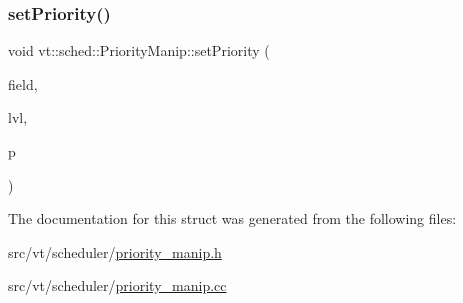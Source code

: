 \mbox{\label{structvt_1_1sched_1_1_priority_manip_a1e3fd14daa6da7902a621d7e175b0d76}} 
\subsubsection{\texorpdfstring{set\+Priority()}{setPriority()}}
{\footnotesize\ttfamily void vt\+::sched\+::\+Priority\+Manip\+::set\+Priority (\begin{DoxyParamCaption}\item[{\hyperlink{namespacevt_a86bff9f556eb761b27fc8600d006ac04}{Priority\+Type} \&}]{field,  }\item[{\hyperlink{namespacevt_a53e07fdb3351b0f263e0dfd51b968d5e}{Priority\+Level\+Type}}]{lvl,  }\item[{\hyperlink{namespacevt_a86bff9f556eb761b27fc8600d006ac04}{Priority\+Type}}]{p }\end{DoxyParamCaption})\hspace{0.3cm}{\ttfamily [static]}}



The documentation for this struct was generated from the following files\+:\begin{DoxyCompactItemize}
\item 
src/vt/scheduler/\hyperlink{priority__manip_8h}{priority\+\_\+manip.\+h}\item 
src/vt/scheduler/\hyperlink{priority__manip_8cc}{priority\+\_\+manip.\+cc}\end{DoxyCompactItemize}
